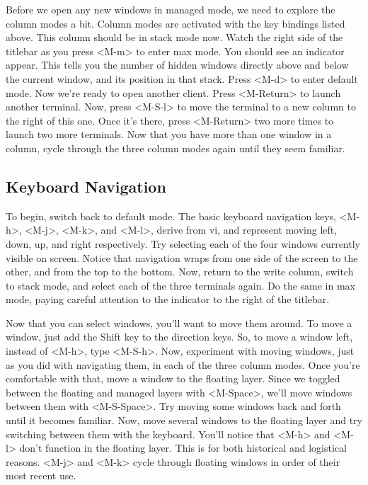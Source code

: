 Before we open any new windows in managed mode, we need to
explore the column modes a bit. Column modes are activated with
the key bindings listed above. This column should be in stack
mode now. Watch the right side of the titlebar as you press
<M-m> to enter max mode. You should see an indicator appear.
This tells you the number of hidden windows directly above and
below the current window, and its position in that stack. Press
<M-d> to enter default mode. Now we're ready to open another
client. Press <M-Return> to launch another terminal. Now,
press <M-S-l> to move the terminal to a new column to the
right of this one. Once it's there, press <M-Return> two
more times to launch two more terminals. Now that you have more
than one window in a column, cycle through the three column
modes again until they seem familiar.

\subsection{Keyboard Navigation}

To begin, switch back to default mode. The basic keyboard
navigation keys, <M-h>, <M-j>, <M-k>, and <M-l>,
derive from vi, and represent moving left, down, up, and right
respectively. Try selecting each of the four windows currently
visible on screen. Notice that navigation wraps from one side of
the screen to the other, and from the top to the bottom. Now,
return to the write column, switch to stack mode, and select
each of the three terminals again. Do the same in max mode,
paying careful attention to the indicator to the right of the
titlebar.

Now that you can select windows, you'll want to move them
around. To move a window, just add the Shift key to the
direction keys. So, to move a window left, instead of <M-h>,
type <M-S-h>. Now, experiment with moving windows, just as
you did with navigating them, in each of the three column modes.
Once you're comfortable with that, move a window to the floating
layer. Since we toggled between the floating and managed layers
with <M-Space>, we'll move windows between them with
<M-S-Space>. Try moving some windows back and forth until it
becomes familiar. Now, move several windows to the floating
layer and try switching between them with the keyboard. You'll
notice that <M-h> and <M-l> don't function in the
floating layer. This is for both historical and logistical
reasons. <M-j> and <M-k> cycle through floating windows
in order of their most recent use.

